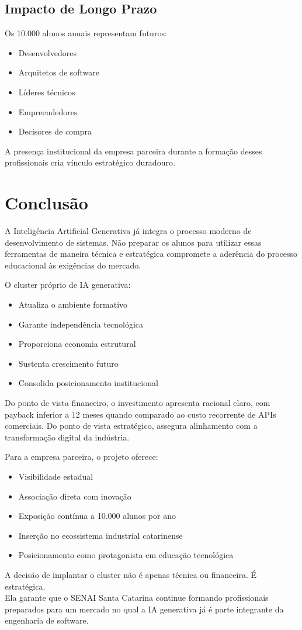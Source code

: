 \documentclass[12pt,a4paper,]{abntex2}
\begin{document}
\section{Impacto de Longo Prazo}
Os 10.000 alunos anuais representam futuros:
\begin{itemize}
    \item Desenvolvedores
    \item Arquitetos de software
    \item Líderes técnicos
    \item Empreendedores
    \item Decisores de compra
\end{itemize}

A presença institucional da empresa parceira durante a formação desses profissionais cria vínculo estratégico duradouro.

\chapter{Conclusão}

A Inteligência Artificial Generativa já integra o processo moderno de desenvolvimento de sistemas.
Não preparar os alunos para utilizar essas ferramentas de maneira técnica e estratégica compromete a aderência do processo educacional às exigências do mercado.

O cluster próprio de IA generativa:
\begin{itemize}
    \item Atualiza o ambiente formativo
    \item Garante independência tecnológica
    \item Proporciona economia estrutural
    \item Sustenta crescimento futuro
    \item Consolida posicionamento institucional
\end{itemize}

Do ponto de vista financeiro, o investimento apresenta racional claro, com payback inferior a 12 meses quando comparado ao custo recorrente de APIs comerciais.
Do ponto de vista estratégico, assegura alinhamento com a transformação digital da indústria.

Para a empresa parceira, o projeto oferece:
\begin{itemize}
    \item Visibilidade estadual
    \item Associação direta com inovação
    \item Exposição contínua a 10.000 alunos por ano
    \item Inserção no ecossistema industrial catarinense
    \item Posicionamento como protagonista em educação tecnológica
\end{itemize}

A decisão de implantar o cluster não é apenas técnica ou financeira. É estratégica.
\\Ela garante que o SENAI Santa Catarina continue formando profissionais preparados para um mercado no qual a IA generativa já é parte integrante da engenharia de software.
\end{document}
